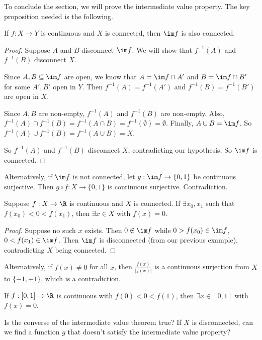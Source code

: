 \documentclass[a4paper]{article}
\begin{document}
To conclude the section, we will prove the intermediate value property. The key proposition needed is the following.
\begin{prop}
  If $f: X\to Y$ is continuous and $X$ is connected, then $\im f$ is also connected.
\end{prop}

\begin{proof}
  Suppose $A$ and $B$ disconnect $\im f$. We will show that $f^{-1}(A)$ and $f^{-1}(B)$ disconnect $X$.

  Since $A, B\subseteq \im f$ are open, we know that $A = \im f\cap A'$ and $B = \im f\cap B'$ for some $A', B'$ open in $Y$. Then $f^{-1}(A) = f^{-1}(A')$ and $f^{-1}(B) = f^{-1}(B')$ are open in $X$.

  Since $A, B$ are non-empty, $f^{-1}(A)$ and $f^{-1}(B)$ are non-empty. Also, $f^{-1}(A) \cap f^{-1}(B) = f^{-1}(A\cap B) = f^{-1}(\emptyset) = \emptyset$. Finally, $A\cup B = \im f$. So $f^{-1}(A)\cup f^{-1}(B) = f^{-1}(A\cup B) = X$.

  So $f^{-1}(A)$ and $f^{-1}(B)$ disconnect $X$, contradicting our hypothesis. So $\im f$ is connected.
\end{proof}
Alternatively, if $\im f$ is not connected, let $g: \im f \to \{0, 1\}$ be continuous surjective. Then $g\circ f: X \to \{0, 1\}$ is continuous surjective. Contradiction.

\begin{thm}
  Suppose $f: X\to \R$ is continuous and $X$ is connected. If $\exists x_0, x_1$ such that $f(x_0) < 0 < f(x_1)$, then $\exists x\in X$ with $f(x) = 0$.
\end{thm}

\begin{proof}
  Suppose no such $x$ exists. Then $0\not\in \im f$ while $0 > f(x_0) \in \im f$, $0 < f(x_1) \in \im f$. Then $\im f$ is disconnected (from our previous example), contradicting $X$ being connected.
\end{proof}
Alternatively, if $f(x) \not= 0$ for all $x$, then $\frac{f(x)}{|f(x)|}$ is a continuous surjection from $X$ to $\{-1, +1\}$, which is a contradiction.

\begin{cor}
  If $f: [0, 1] \to \R$ is continuous with $f(0) < 0 < f(1)$, then $\exists x\in [0, 1]$ with $f(x) = 0$.
\end{cor}
Is the converse of the intermediate value theorem true? If $X$ is disconnected, can we find a function $g$ that doesn't satisfy the intermediate value property?
\end{document}

